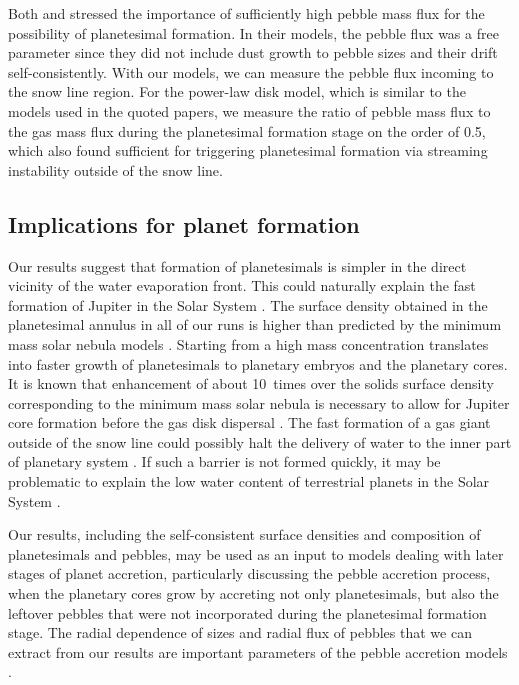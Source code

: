 \documentclass{aa}
\begin{document}
Both \citet{2016A&A...596L...3I} and \citet{2017A&A...602A..21S} stressed the importance of sufficiently high pebble mass flux for the possibility of planetesimal formation. In their models, the pebble flux was a free parameter since they did not include dust growth to pebble sizes and their drift self-consistently. With our models, we can measure the pebble flux incoming to the snow line region. For the power-law disk model, which is similar to the models used in the quoted papers, we measure the ratio of pebble mass flux to the gas mass flux during the planetesimal formation stage on the order of 0.5, which \citet{2017A&A...602A..21S} also found sufficient for triggering planetesimal formation via streaming instability outside of the snow line. 

\subsection{Implications for planet formation}

Our results suggest that formation of planetesimals is simpler in the direct vicinity of the water evaporation front.
This could naturally explain the fast formation of Jupiter in the Solar System \citep{2017LPI....48.1386K}. 
The surface density obtained in the planetesimal annulus in all of our runs is higher than predicted by the minimum mass solar nebula models \citep{1977Ap&SS..51..153W, 1981PThPS..70...35H}. Starting from a high mass concentration translates into faster growth of planetesimals to planetary embryos and the planetary cores. It is known that enhancement of about 10~times over the solids surface density corresponding to the minimum mass solar nebula is necessary to allow for Jupiter core formation before the gas disk dispersal \citep{1996Icar..124...62P, 2000ApJ...537.1013I, 2010Icar..209..836K}. 
The fast formation of a gas giant outside of the snow line could possibly halt the delivery of water to the inner part of planetary system \citep{2015Icar..258..418M}. If such a barrier is not formed quickly, it may be problematic to explain the low water content of terrestrial planets in the Solar System \citep{2016A&A...589A..15S}.

Our results, including the self-consistent surface densities and composition of planetesimals and pebbles, may be used as an input to models dealing with later stages of planet accretion, particularly discussing the pebble accretion process, when the planetary cores grow by accreting not only planetesimals, but also the leftover pebbles that were not incorporated during the planetesimal formation stage. The radial dependence of sizes and radial flux of pebbles that we can extract from our results are important parameters of the pebble accretion models \citep{2010A&A...520A..43O, 2014A&A...572A.107L, 2015Natur.524..322L, 2016A&A...586A..66V}.
\end{document}
